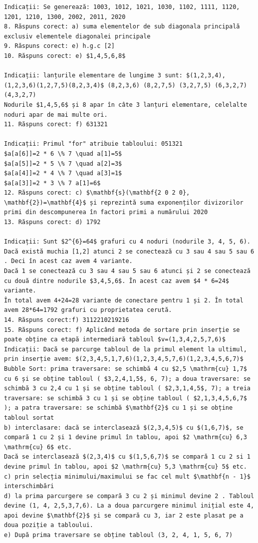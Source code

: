\documentclass[10pt]{article}
\begin{document}
\begin{verbatim}
Indicații: Se generează: 1003, 1012, 1021, 1030, 1102, 1111, 1120, 1201, 1210, 1300, 2002, 2011, 2020
8. Răspuns corect: a) suma elementelor de sub diagonala principală exclusiv elementele diagonalei principale
9. Răspuns corect: e) h.g.c [2]
10. Răspuns corect: e) $1,4,5,6,8$

Indicații: lanțurile elementare de lungime 3 sunt: $(1,2,3,4),(1,2,3,6)(1,2,7,5)(8,2,3,4)$ (8,2,3,6) (8,2,7,5) (3,2,7,5) (6,3,2,7) (4,3,2,7)
Nodurile $1,4,5,6$ și 8 apar în câte 3 lanțuri elementare, celelalte noduri apar de mai multe ori.
11. Răspuns corect: f) 631321

Indicații: Primul "for" atribuie tabloului: 051321
$a[a[6]]=2 * 6 \% 7 \quad a[1]=5$
$a[a[5]]=2 * 5 \% 7 \quad a[2]=3$
$a[a[4]]=2 * 4 \% 7 \quad a[3]=1$
$a[a[3]]=2 * 3 \% 7 a[1]=6$
12. Răspuns corect: c) $\mathbf{s}(\mathbf{2 0 2 0}, \mathbf{2})=\mathbf{4}$ și reprezintă suma exponenților divizorilor primi din descompunerea în factori primi a numărului 2020
13. Răspuns corect: d) 1792

Indicații: Sunt $2^{6}=64$ grafuri cu 4 noduri (nodurile 3, 4, 5, 6).
Dacă există muchia [1,2] atunci 2 se conectează cu 3 sau 4 sau 5 sau 6 . Deci în acest caz avem 4 variante.
Dacă 1 se conectează cu 3 sau 4 sau 5 sau 6 atunci și 2 se conectează cu două dintre nodurile $3,4,5,6$. În acest caz avem $4 * 6=24$ variante.
În total avem 4+24=28 variante de conectare pentru 1 și 2. În total avem 28*64=1792 grafuri cu proprietatea cerută.
14. Răspuns corect:f) 3112210219216
15. Răspuns corect: f) Aplicând metoda de sortare prin inserție se poate obține ca etapă intermediară tabloul $v=(1,3,4,2,5,7,6)$
Indicații: Dacă se parcurge tabloul de la primul element la ultimul, prin inserție avem: $(2,3,4,5,1,7,6)(1,2,3,4,5,7,6)(1,2,3,4,5,6,7)$
Bubble Sort: prima traversare: se schimbă 4 cu $2,5 \mathrm{cu} 1,7$ cu 6 și se obține tabloul ( $3,2,4,1,5$, 6, 7); a doua traversare: se schimbă 3 cu 2,4 cu 1 și se obține tabloul ( $2,3,1,4,5$, 7); a treia traversare: se schimbă 3 cu 1 și se obține tabloul ( $2,1,3,4,5,6,7$ ); a patra traversare: se schimbă $\mathbf{2}$ cu 1 și se obține tabloul sortat
b) interclasare: dacă se interclasează $(2,3,4,5)$ cu $(1,6,7)$, se compară 1 cu 2 și 1 devine primul în tablou, apoi $2 \mathrm{cu} 6,3 \mathrm{cu} 6$ etc.
Dacă se interclasează $(2,3,4)$ cu $(1,5,6,7)$ se compară 1 cu 2 si 1 devine primul în tablou, apoi $2 \mathrm{cu} 5,3 \mathrm{cu} 5$ etc.
c) prin selecția minimului/maximului se fac cel mult $\mathbf{n - 1}$ interschimbări
d) la prima parcurgere se compară 3 cu 2 și minimul devine 2 . Tabloul devine (1, 4, 2,5,3,7,6). La a doua parcurgere minimul inițial este 4, apoi devine $\mathbf{2}$ și se compară cu 3, iar 2 este plasat pe a doua poziție a tabloului.
e) După prima traversare se obține tabloul (3, 2, 4, 1, 5, 6, 7)


\end{verbatim}
\end{document}
